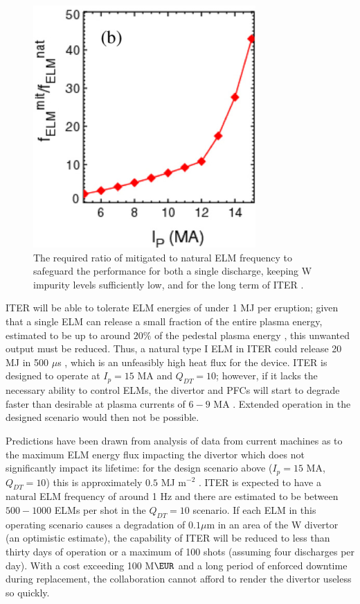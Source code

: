 \documentclass[11pt, twocolumn]{article}  %
\begin{document}
\begin{figure}
\includegraphics[scale=0.8]{Figures/FreqEnhance.PNG}
\centering
\caption{The required ratio of mitigated to natural ELM frequency to safeguard the performance for both a single discharge, keeping W impurity levels sufficiently low, and for the long term of ITER \cite{Kirk2013}.}\label{fig:FreqEnhance}
\end{figure}

ITER will be able to tolerate ELM energies of under 1 MJ per eruption; given that a single ELM can release a small fraction of the entire plasma energy, estimated to be up to around $20\%$ of the pedestal plasma energy \cite{Loarte2003}, this unwanted output must be reduced. Thus, a natural type I ELM in ITER could release 20 MJ in 500 $\mu$s \cite{KirkFF}, which is an unfeasibly high heat flux for the device. ITER is designed to operate at $I_p = 15$ MA and $Q_{DT} = 10$; however, if it lacks the necessary ability to control ELMs, the divertor and PFCs will start to degrade faster than desirable at plasma currents of $6-9$ MA \cite{Lang2013}. Extended operation in the designed scenario would then not be possible.

Predictions have been drawn from analysis of data from current machines as to the maximum ELM energy flux impacting the divertor which does not significantly impact its lifetime: for the design scenario above ($I_p = 15$ MA, $Q_{DT} = 10$) this is approximately $0.5$ MJ m$^{-2}$ \cite{LoarteTR2013}. ITER is expected to have a natural ELM frequency of around 1 Hz \cite{KirkFF} and there are estimated to be between $500-1000$ ELMs per shot in the $Q_{DT}=10$ scenario. If each ELM in this operating scenario causes a degradation of $0.1 \mu$m in an area of the W divertor (an optimistic estimate), the capability of ITER will be reduced to less than thirty days of operation or a maximum of 100 shots \cite{Lang2013} (assuming four discharges per day). With a cost exceeding 100 M$\EUR$ \cite{Tsitrone2013} and a long period of enforced downtime during replacement, the collaboration cannot afford to render the divertor useless so quickly.
\end{document}
